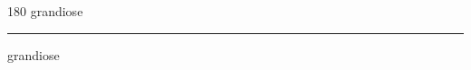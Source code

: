 
\begin{frame}
\begin{center}
\begin{turn}{180}
{\fontsize{2.5cm}{1em}\selectfont grandiose}
\end{turn}
\vspace{1em}\par  
\hrule
\vspace{1em}\par  
{\fontsize{2.5cm}{1em}\selectfont grandiose}
\end{center}
\end{frame}
